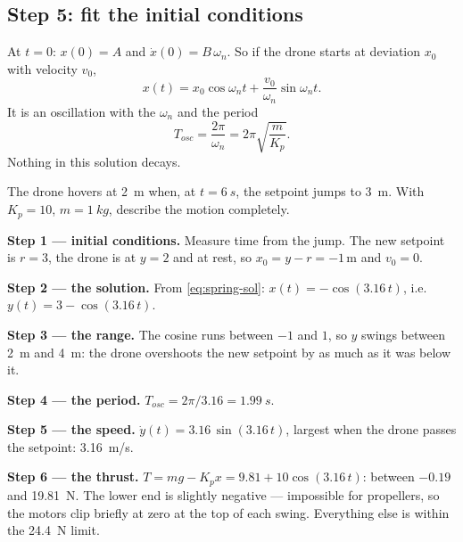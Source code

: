 \subsection{Step 5: fit the initial conditions}
At $t = 0$: $x(0) = A$ and $\dot x(0) = B\,\omega_n$. So if the drone starts at deviation $x_0$ with velocity $v_0$,
\begin{equation}\label{eq:spring-sol}
  x(t) = x_0 \cos\omega_n t + \frac{v_0}{\omega_n}\sin\omega_n t .
\end{equation}
It is an oscillation with the  $\omega_n$ and the period
\begin{equation}\label{eq:spring-period}
  T_{osc} = \frac{2\pi}{\omega_n} = 2\pi\sqrt{\frac{m}{K_p}}.
\end{equation}
Nothing in this solution decays.

\begin{example}
\label{ex:spring-step}
The drone hovers at \SI{2}{m} when, at $t = \SI{6}{s}$, the setpoint jumps to \SI{3}{m}. With $K_p = 10$, $m = \SI{1}{kg}$, describe the motion completely.

\textbf{Step 1 — initial conditions.} Measure time from the jump. The new setpoint is $r = 3$, the drone is at $y = 2$ and at rest, so $x_0 = y - r = -1$\,m and $v_0 = 0$.

\textbf{Step 2 — the solution.} From \cref{eq:spring-sol}: $x(t) = -\cos(3.16\,t)$, i.e.\ $y(t) = 3 - \cos(3.16\,t)$.

\textbf{Step 3 — the range.} The cosine runs between $-1$ and $1$, so $y$ swings between \SI{2}{m} and \SI{4}{m}: the drone overshoots the new setpoint by as much as it was below it.

\textbf{Step 4 — the period.} $T_{osc} = 2\pi/3.16 = \SI{1.99}{s}$.

\textbf{Step 5 — the speed.} $\dot y(t) = 3.16\,\sin(3.16\,t)$, largest when the drone passes the setpoint: \SI{3.16}{m/s}.

\textbf{Step 6 — the thrust.} $T = mg - K_p x = 9.81 + 10\cos(3.16\,t)$: between $-0.19$ and \SI{19.81}{N}. The lower end is slightly negative — impossible for propellers, so the motors clip briefly at zero at the top of each swing. Everything else is within the \SI{24.4}{N} limit.
\end{example}

